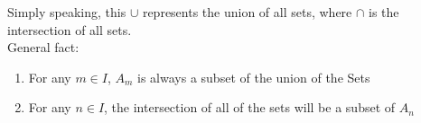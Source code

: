 \documentclass{article}
\begin{document}
Simply speaking, this $\cup$ represents the union of all sets, where $\cap$ is the intersection of all sets. \\

General fact: 

\begin{enumerate}
    \item For any $m \in I$, $A_m$ is always a subset of the union of the Sets
    \item For any $n \in I$, the intersection of all of the sets will be a subset of $A_n$
\end{enumerate}
\end{document}
